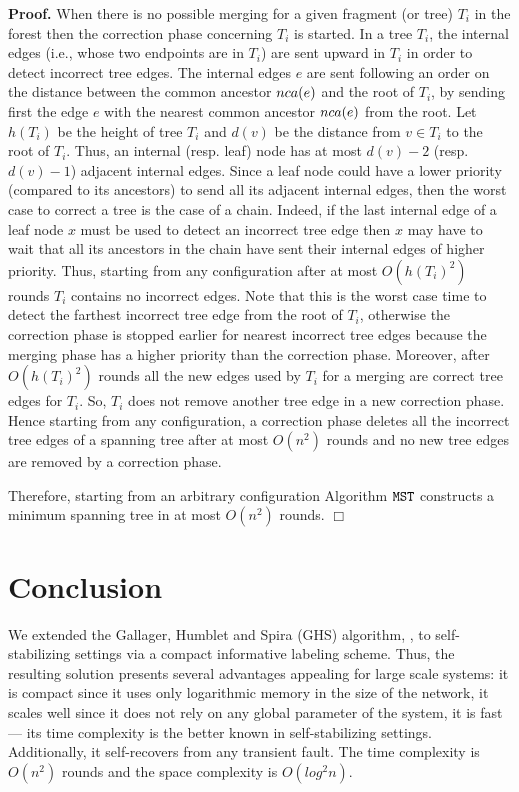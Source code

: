 \documentclass[11pt,a4paper]{article}
\newenvironment{proof}{\noindent \begin{rm}{\textbf{Proof.} }}{\hspace*{\fill}$\Box$\par\end{rm}}
\newcommand{\Lca}{\mbox{\rm $nca$}}
\newcommand{\MST}{\mbox{\tt MST}}
\begin{document}
\begin{proof}
When there is no possible merging for a given fragment (or tree) $T_i$ in the forest then the correction phase concerning $T_i$ is started. In a tree $T_i$, the internal edges (i.e., whose two endpoints are in $T_i$) are sent upward in $T_i$ in order to detect incorrect tree edges. The internal edges $e$ are sent following an order on the distance between the common ancestor $\Lca(e)$ and the root of $T_i$, by sending first the edge $e$ with the nearest common ancestor $\Lca(e)$ from the root. Let $h(T_i)$ be the height of tree $T_i$ and $d(v)$ be the distance from $v \in T_i$ to the root of $T_i$. Thus, an internal (resp. leaf) node has at most $d(v)-2$ (resp. $d(v)-1$) adjacent internal edges. Since a leaf node could have a lower priority (compared to its ancestors) to send all its adjacent internal edges, then the worst case to correct a tree is the case of a chain. Indeed, if the last internal edge of a leaf node $x$ must be used to detect an incorrect tree edge then $x$ may have to wait that all its ancestors in the chain have sent their internal edges of higher priority. Thus, starting from any configuration after at most $O(h(T_i)^2)$ rounds $T_i$ contains no incorrect edges. Note that this is the worst case time to detect the farthest incorrect tree edge from the root of $T_i$, otherwise the correction phase is stopped earlier for nearest incorrect tree edges because the merging phase has a higher priority than the correction phase. Moreover, after $O(h(T_i)^2)$ rounds all the new edges used by $T_i$ for a merging are correct tree edges for $T_i$. So, $T_i$ does not remove another tree edge in a new correction phase. Hence starting from any configuration, a correction phase deletes all the incorrect tree edges of a spanning tree after at most $O(n^2)$ rounds and no new tree edges are removed by a correction phase.

Therefore, starting from an arbitrary configuration Algorithm $\MST$ constructs a minimum spanning tree in at most $O(n^2)$ rounds.
\end{proof}

\section{Conclusion}
We extended the Gallager, Humblet and Spira (GHS) algorithm, 
\cite{GallagerHS83}, 
to self-stabilizing settings via a compact informative labeling scheme.
Thus, the resulting solution presents several advantages 
appealing for large scale systems: it is compact since it 
uses only logarithmic memory in the size of the network, 
it scales well since it does not rely on any global 
parameter of the system, it is fast --- its time complexity is the 
better known in self-stabilizing settings. Additionally, it self-recovers 
from any transient fault. The time complexity is $O(n^2)$
rounds and the space complexity is $O(log^2n)$.
\end{document}
